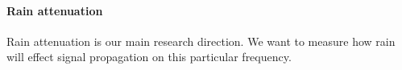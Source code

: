 \documentclass[
11pt, %
a4paper, %
oneside, %
headinclude,footinclude, %
BCOR5mm, %
]{scrartcl}
\begin{document}
\paragraph{Rain attenuation}
Rain attenuation is our main research direction. We want to measure how
rain will effect signal propagation on this particular frequency.

\newpage
\renewcommand{\refname}{\spacedlowsmallcaps{References}} %




\end{document}
